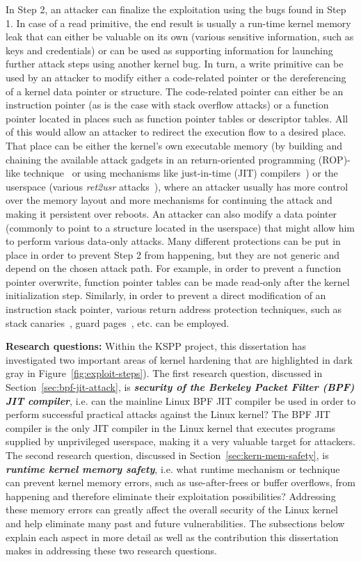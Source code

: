 In Step 2, an attacker can finalize the exploitation using the bugs found in Step 1. In case of a read primitive, the end result is usually a run-time kernel memory leak that can either be valuable on its own (various sensitive information, such as keys and credentials) or can be used as supporting information for launching further attack steps using another kernel bug. In turn, a write primitive can be used by an attacker to modify either a code-related pointer or the dereferencing of a kernel data pointer or structure. The code-related pointer can either be an instruction pointer (as is the case with stack overflow attacks) or a function pointer located in places such as function pointer tables or descriptor tables. All of this would allow an attacker to redirect the execution flow to a desired place. That place can be either the kernel's own executable memory (by building and chaining the available attack gadgets in an return-oriented programming (ROP)-like technique~\cite{Shacham2007} or using mechanisms like just-in-time (JIT) compilers~\cite{Aycock03abrief}) or the userspace (various \textit{ret2usr} attacks~\cite{Kemerlis2012}), where an attacker usually has more control over the memory layout and more mechanisms for continuing the attack and making it persistent over reboots. An attacker can also modify a data pointer (commonly to point to a structure located in the userspace) that might allow him to perform various data-only attacks. Many different protections can be put in place in order to prevent Step 2 from happening, but they are not generic and depend on the chosen attack path. For example, in order to prevent a function pointer overwrite, function pointer tables can be made read-only after the kernel initialization step. Similarly, in order to prevent a direct modification of an instruction stack pointer, various return address protection techniques, such as stack canaries~\cite{edge2014}, guard pages~\cite{kstackoverflow2017}, etc. can be employed.   

\textbf{Research questions:}   Within the KSPP project, this dissertation has investigated two important areas of kernel hardening that are highlighted in dark gray in Figure~\ref{fig:exploit-steps}). The first research question, discussed in Section~\ref{sec:bpf-jit-attack}, is \textit{\textbf{security of the Berkeley Packet Filter (BPF) JIT compiler}}, i.e. can the mainline Linux BPF JIT compiler be used in order to perform successful practical attacks against the Linux kernel? The BPF JIT compiler is the only JIT compiler in the Linux kernel that executes programs supplied by unprivileged userspace, making it a very valuable target for attackers.  The second research question, discussed in Section~\ref{sec:kern-mem-safety}, is \textbf{\textbf{\textit{runtime kernel memory safety}}}, i.e. what runtime mechanism or technique can prevent kernel memory errors, such as use-after-frees or buffer overflows, from happening and therefore eliminate their exploitation possibilities? Addressing these memory errors can greatly affect the overall security of the Linux kernel and help eliminate many past and future vulnerabilities. The subsections below explain each aspect in more detail as well as the contribution this dissertation makes in addressing these two research questions.  

